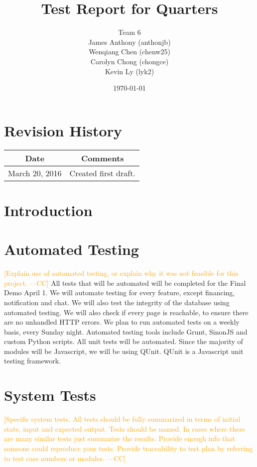 \documentclass[12pt]{article}
\newcommand{\authornote}[3]{\textcolor{#1}{[#3 ---#2]}}
\newcommand{\authornote}[3]{}
\newcommand{\cc}[1]{\authornote{orange}{CC}{#1}}
\begin{document}
\title{Test Report for Quarters} 
\author{Team 6\\ James Anthony (anthonjb)\\ Wenqiang Chen (chenw25)\\ Carolyn Chong 
(chongce)\\ Kevin Ly (lyk2)}
\date{\today}
  
\maketitle

\pagebreak

\tableofcontents
\listoffigures
\listoftables

\section*{Revision History}
\begin{tabular}{|c|c|}
\hline
\textbf{Date}  & \textbf{Comments} \\ \hline
March 20, 2016 & Created first draft. \\ 
\hline
\end{tabular}

\pagebreak


\section{Introduction}


\section{Automated Testing}
\cc{Explain use of automated testing, or explain why it was not feasible for this project.}
All tests that will be automated will be completed for the Final Demo April 1. We will automate testing for every feature, except financing, notification and chat. We will also test the integrity of the database using automated testing. We will also check if every page is reachable, to ensure there are no unhandled HTTP errors. We plan to run automated tests on a weekly basis, every Sunday night. Automated testing tools include Grunt, SinonJS and custom Python scripts. All unit tests will be automated. Since the majority of modules will be Javascript, we will be using QUnit. QUnit is a Javascript unit testing framework. 

\section{System Tests}
\cc{Specific system tests.  All tests should be fully summarized in terms of initial state, input and expected output. Tests should be named. In cases where there are many similar tests just summarize the results. Provide enough info that someone could reproduce your tests. Provide traceability to test plan by referring to test case numbers or modules.}
\end{document}
